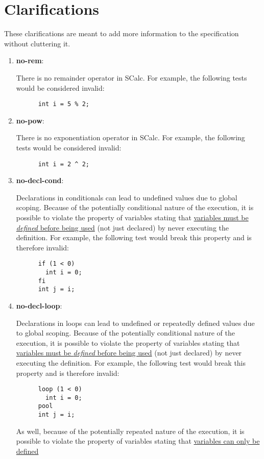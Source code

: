 \documentclass{article}
\newcommand{\clarificationdest}[1]{\hypertarget{#1}{\textbf{#1}:}}
\begin{document}
\section{Clarifications}
These clarifications are meant to add more information to the specification without cluttering it.
\begin{enumerate}
  \item
    \clarificationdest{no-rem}
    There is no remainder operator in SCalc. For example, the following tests would be considered
    invalid:
    \begin{lstlisting}
      int i = 5 % 2;
    \end{lstlisting}
  \item
    \clarificationdest{no-pow}
    There is no exponentiation operator in SCalc. For example, the following tests would be
    considered invalid:
    \begin{lstlisting}
      int i = 2 ^ 2;
    \end{lstlisting}
  \item
    \clarificationdest{no-decl-cond}
    Declarations in conditionals can lead to undefined values due to global scoping.  Because of
    the potentially conditional nature of the execution, it is possible to violate the property of
    variables stating that \hyperlink{variable-props}{variables must be \textit{defined} before
    being used} (not just declared) by never executing the definition. For example, the following
    test would break this property and is therefore invalid:
    \begin{lstlisting}
      if (1 < 0)
        int i = 0;
      fi
      int j = i;
    \end{lstlisting}
  \item
    \clarificationdest{no-decl-loop}
    Declarations in loops can lead to undefined or repeatedly defined values due to global scoping.
    Because of the potentially conditional nature of the execution, it is possible to violate the
    property of variables stating that \hyperlink{variable-props}{variables must be
    \textit{defined} before being used} (not just declared) by never executing the definition. For
    example, the following test would break this property and is therefore invalid:
    \begin{lstlisting}
      loop (1 < 0)
        int i = 0;
      pool
      int j = i;
    \end{lstlisting}
    As well, because of the potentially repeated nature of the execution, it is possible to violate
    the property of variables stating that \hyperlink{variable-props}{variables can only be defined
}
\end{enumerate}
\end{document}
